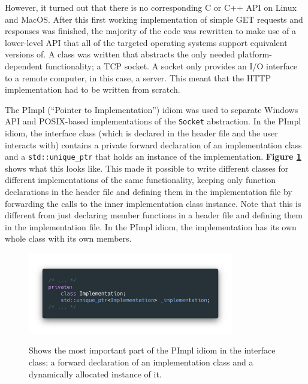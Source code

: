 \documentclass[12pt, a4paper]{article}
\begin{document}
However, it turned out that there is no corresponding C or C++ API on Linux and MacOS. After this first working implementation of simple GET requests and responses was finished, the majority of the code was rewritten to make use of a lower-level API that all of the targeted operating systems support equivalent versions of. A class was written that abstracts the only needed platform-dependent functionality; a TCP socket. A socket only provides an I/O interface to a remote computer, in this case, a server. This meant that the HTTP implementation had to be written from scratch.

The PImpl (“Pointer to Implementation”) idiom \parencite{CppPImplIdiom} was used to separate Windows API and POSIX-based implementations of the \texttt{Socket} abstraction. In the PImpl idiom, the interface class (which is declared in the header file and the user interacts with) contains a private forward declaration \parencite{CppClassDeclaration} of an implementation class and a \texttt{std::unique\_ptr} that holds an instance of the implementation. \textbf{Figure \ref{fig:pimpl_forward_declaration}} shows what this looks like. This made it possible to write different classes for different implementations of the same functionality, keeping only function declarations in the header file and defining them in the implementation file by forwarding the calls to the inner implementation class instance. Note that this is different from just declaring member functions in a header file and defining them in the implementation file. In the PImpl idiom, the implementation has its own whole class with its own members.

\begin{figure}[hp]
	\centering
	\caption{Shows the most important part of the PImpl idiom in the interface class; a forward declaration of an implementation class and a dynamically allocated instance of it.}
	\includegraphics[width=0.8\textwidth]{pimpl_forward_declaration}
	\label{fig:pimpl_forward_declaration}
\end{figure}
\end{document}
